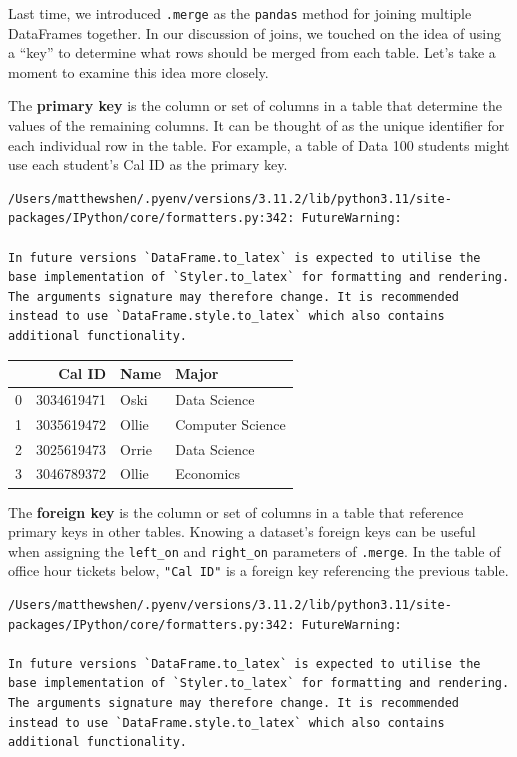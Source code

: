 \documentclass[
  letterpaper,
  DIV=11,
  numbers=noendperiod]{scrreprt}
\begin{document}
Last time, we introduced \texttt{.merge} as the \texttt{pandas} method
for joining multiple DataFrames together. In our discussion of joins, we
touched on the idea of using a ``key'' to determine what rows should be
merged from each table. Let's take a moment to examine this idea more
closely.

The \textbf{primary key} is the column or set of columns in a table that
determine the values of the remaining columns. It can be thought of as
the unique identifier for each individual row in the table. For example,
a table of Data 100 students might use each student's Cal ID as the
primary key.

\begin{verbatim}
/Users/matthewshen/.pyenv/versions/3.11.2/lib/python3.11/site-packages/IPython/core/formatters.py:342: FutureWarning:

In future versions `DataFrame.to_latex` is expected to utilise the base implementation of `Styler.to_latex` for formatting and rendering. The arguments signature may therefore change. It is recommended instead to use `DataFrame.style.to_latex` which also contains additional functionality.
\end{verbatim}

\begin{tabular}{lrll}
\toprule
{} &      Cal ID &   Name &             Major \\
\midrule
0 &  3034619471 &   Oski &      Data Science \\
1 &  3035619472 &  Ollie &  Computer Science \\
2 &  3025619473 &  Orrie &      Data Science \\
3 &  3046789372 &  Ollie &         Economics \\
\bottomrule
\end{tabular}

The \textbf{foreign key} is the column or set of columns in a table that
reference primary keys in other tables. Knowing a dataset's foreign keys
can be useful when assigning the \texttt{left\_on} and
\texttt{right\_on} parameters of \texttt{.merge}. In the table of office
hour tickets below, \texttt{"Cal\ ID"} is a foreign key referencing the
previous table.

\begin{verbatim}
/Users/matthewshen/.pyenv/versions/3.11.2/lib/python3.11/site-packages/IPython/core/formatters.py:342: FutureWarning:

In future versions `DataFrame.to_latex` is expected to utilise the base implementation of `Styler.to_latex` for formatting and rendering. The arguments signature may therefore change. It is recommended instead to use `DataFrame.style.to_latex` which also contains additional functionality.
\end{verbatim}
\end{document}
